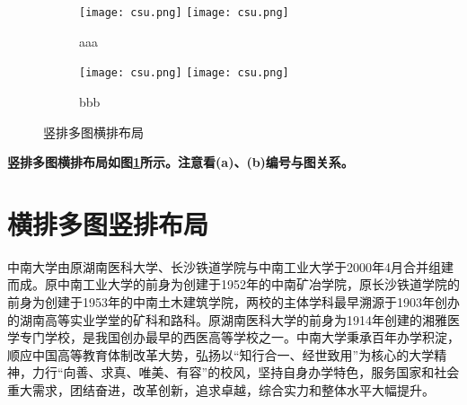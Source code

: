 \begin{figure}[!htb]
    \centering
    \begin{subfigure}[t]{0.13\linewidth}
        \captionsetup{justification=centering} 
        \begin{minipage}[b]{1\linewidth}
        \texttt{[image: csu.png]} \vspace{-1ex} \vfill
        \texttt{[image: csu.png]}
        \caption{aaa}
        \end{minipage}
    \end{subfigure}
    \begin{subfigure}[t]{0.13\linewidth}
        \captionsetup{justification=centering} 
        \begin{minipage}[b]{1\linewidth}
        \texttt{[image: csu.png]} \vspace{-1ex} \vfill
        \texttt{[image: csu.png]}
        \caption{bbb}
        \end{minipage}
    \end{subfigure}
    \caption{竖排多图横排布局}
    \label{F.csu_col_row}
\end{figure}

\textbf{竖排多图横排布局如图\ref{F.csu_col_row}所示。注意看(a)、(b)编号与图关系。}


\section{横排多图竖排布局}

中南大学由原湖南医科大学、长沙铁道学院与中南工业大学于2000年4月合并组建而成。原中南工业大学的前身为创建于1952年的中南矿冶学院，原长沙铁道学院的前身为创建于1953年的中南土木建筑学院，两校的主体学科最早溯源于1903年创办的湖南高等实业学堂的矿科和路科。原湖南医科大学的前身为1914年创建的湘雅医学专门学校，是我国创办最早的西医高等学校之一。中南大学秉承百年办学积淀，顺应中国高等教育体制改革大势，弘扬以“知行合一、经世致用”为核心的大学精神，力行“向善、求真、唯美、有容”的校风，坚持自身办学特色，服务国家和社会重大需求，团结奋进，改革创新，追求卓越，综合实力和整体水平大幅提升。

